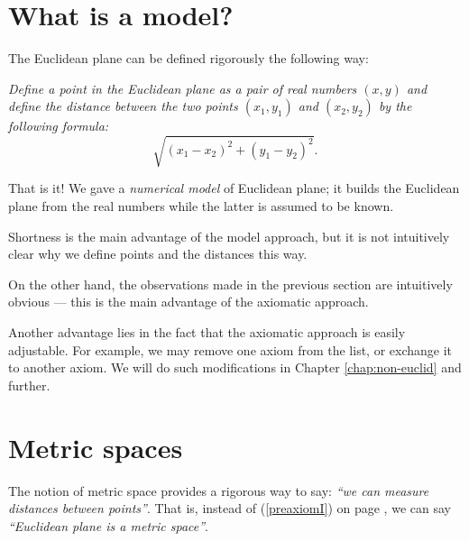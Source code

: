 \section*{What is a model?}
\label{page:model}

The Euclidean plane can be defined rigorously the following way:

{}\emph{Define a {}\emph{point} in the Euclidean plane as a pair of real numbers $(x,y)$ and define the {}\emph{distance} between the two points $(x_1,y_1)$ and $(x_2,y_2)$ by the following formula:}
\[\sqrt{(x_1-x_2)^2+(y_1-y_2)^2}.\]

That is it!
We gave a {}\emph{numerical model} of Euclidean plane;
it builds the Euclidean plane from the real numbers
while the latter is assumed to be known.

Shortness is the main advantage of the model approach,
but it is not intuitively clear why we define points and the distances this way.

On the other hand, the observations made in the previous section are intuitively obvious ---
this is the main advantage of the axiomatic approach.

Another advantage lies in the fact that the axiomatic approach is easily adjustable. 
For example, we may remove one axiom from the list,
or exchange it to another axiom. 
We will do such modifications in Chapter \ref{chap:non-euclid} and further.

\section*{Metric spaces}

The notion of metric space provides 
a rigorous way to say: {}\emph{``we can measure distances between points''}.
That is, instead of (\ref{preaxiomI}) on page \pageref{preaxiomI},
we can say {}\emph{``Euclidean plane is a metric space''}.

